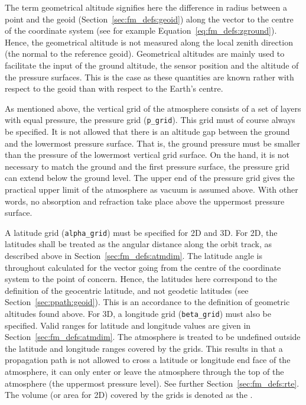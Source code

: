  The term
geometrical altitude signifies here the difference in radius between a
point and the geoid (Section~\ref{sec:fm_defs:geoid}) along the vector
to the centre of the coordinate system (see for example
Equation~\ref{eq:fm_defs:zground}). Hence, the geometrical altitude is
not measured along the local zenith direction (the normal to the
reference geoid). Geometrical altitudes are mainly used to
facilitate the input of the ground altitude, the sensor position and
the altitude of the pressure surfaces. This is the case as these
quantities are known rather with respect to the geoid than with
respect to the Earth's centre.


  
\label{sec:fm_defs:grids}

As mentioned above, the vertical grid of the atmosphere consists of a
set of layers with equal pressure, the pressure grid (\verb|p_grid|).
This grid must of course always be specified. It is not allowed that
there is an altitude gap between the ground and the lowermost pressure
surface.  That is, the ground pressure must be smaller than the
pressure of the lowermost vertical grid surface. On the hand, it is
not necessary to match the ground and the first pressure surface, the
pressure grid can extend below the ground level. The upper end of the
pressure grid gives the practical upper limit of the atmosphere as
vacuum is assumed above. With other words, no absorption and
refraction take place above the uppermost pressure surface.

A latitude grid (\verb|alpha_grid|) must be specified for 2D and 3D.
For 2D, the latitudes shall be treated as the angular distance along
the orbit track, as described above in
Section~\ref{sec:fm_defs:atmdim}.  The latitude angle is throughout
calculated for the vector going from the centre of the coordinate
system to the point of concern. Hence, the latitudes here correspond
to the definition of the geocentric latitude, and not geodetic
latitudes (see Section~\ref{sec:ppath:geoid}). This is an accordance
to the definition of geometric altitudes found above. For 3D, a
longitude grid (\verb|beta_grid|) must also be specified. Valid ranges
for latitude and longitude values are given in
Section~\ref{sec:fm_defs:atmdim}.  The atmosphere is treated to be
undefined outside the latitude and longitude ranges covered by the
grids. This results in that a propagation path is not allowed to
cross a latitude or longitude end face of the atmosphere, it can only
enter or leave the atmosphere through the top of the atmosphere (the
uppermost pressure level). See further Section~\ref{sec:fm_defs:rte}.
The volume (or area for 2D) covered by the grids is denoted as the
.

